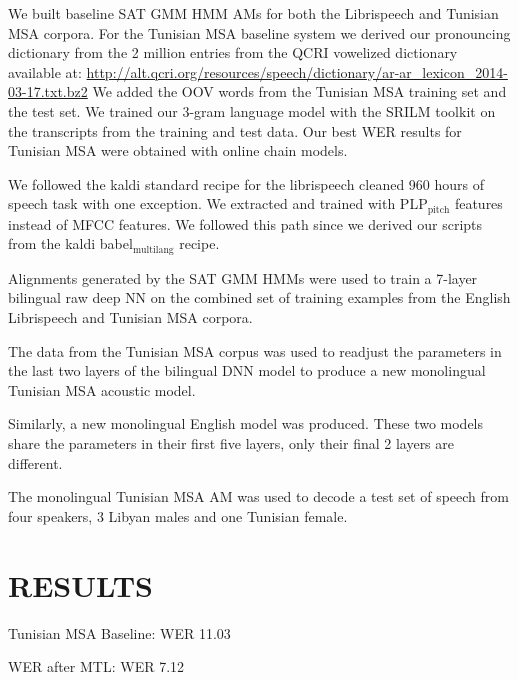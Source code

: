 \documentclass[11pt]{article}
\begin{document}
We built baseline \gls{SAT} \gls{GMM} \gls{HMM} \gls{AM}s for both the Librispeech and Tunisian \gls{MSA} corpora.
For the Tunisian \gls{MSA} baseline system we derived our pronouncing dictionary from the 2 million entries from the \gls{QCRI} vowelized dictionary\cite{aaliArabicKaldi} available at:
\url{http://alt.qcri.org/resources/speech/dictionary/ar-ar_lexicon_2014-03-17.txt.bz2}
We added the \gls{OOV} words from the Tunisian \gls{MSA} training set and the test set. 
We trained our $3$-gram language model with the \gls{SRILM} toolkit on the transcripts from the training and test data. 
Our best \gls{WER} results for Tunisian \gls{MSA} were obtained with online chain models.

We followed the kaldi standard recipe for the librispeech cleaned 960 hours of speech task with one exception. 
We extracted and trained with \gls{PLP}$_{\text{pitch}}$ features instead of \gls{MFCC} features. 
We followed this path since we derived our scripts from the kaldi babel$_{\text{multilang}}$ recipe. 

Alignments generated by the  \gls{SAT} \gls{GMM} \gls{HMM}s were used to train a 7-layer bilingual raw deep \gls{NN}  on the combined set of training examples from the English Librispeech and Tunisian \gls{MSA}  corpora.


The data from the Tunisian \gls{MSA} corpus was used to readjust the parameters in the last two layers of the bilingual \gls{DNN} model to produce a new monolingual Tunisian \gls{MSA}  acoustic model. 

Similarly, a new monolingual English model was produced.
These two models share the parameters in their first five layers, only their final 2 layers are different.

The monolingual Tunisian \gls{MSA} \gls{AM} was used to decode a test set of speech from four speakers, 3 Libyan males and one Tunisian female.

\section{RESULTS}
\label{sec-5}

Tunisian \gls{MSA} Baseline: \gls{WER} 11.03 %

WER after MTL: \gls{WER} 7.12 %




\printglossaries

\end{document}
